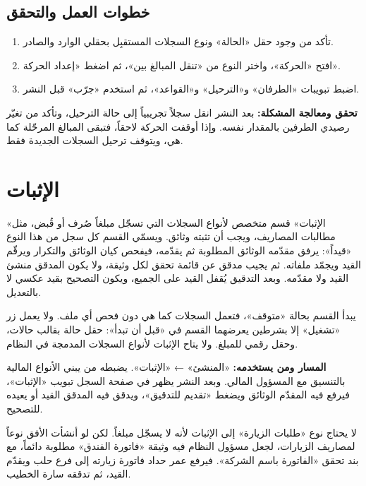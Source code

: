 \subsection{خطوات العمل والتحقق}
\begin{enumerate}
\item تأكد من وجود حقل «الحالة» ونوع السجلات المستقبِل بحقلي الوارد والصادر.
\item افتح «الحركة»، واختر النوع من «تنقل المبالغ بين»، ثم اضغط «إعداد الحركة».
\item اضبط تبويبات «الطرفان» و«الترحيل» و«القواعد»، ثم استخدم «جرّب» قبل النشر.
\end{enumerate}

\textbf{تحقق ومعالجة المشكلة:} بعد النشر انقل سجلاً تجريبياً إلى حالة الترحيل، وتأكد من تغيّر رصيدي الطرفين بالمقدار نفسه. وإذا أوقفت الحركة لاحقاً، فتبقى المبالغ المرحّلة كما هي، ويتوقف ترحيل السجلات الجديدة فقط.

\clearpage
\section{الإثبات}
\label{sec:builder-feature-evidence}

«الإثبات» قسم متخصص لأنواع السجلات التي تسجّل مبلغاً صُرف أو قُبض، مثل مطالبات المصاريف، ويجب أن تثبته وثائق. ويسمّي القسم كل سجل من هذا النوع «قيداً»: يرفق مقدّمه الوثائق المطلوبة ثم يقدّمه، فيفحص كيان الوثائق والتكرار ويرقّم القيد ويجمّد ملفاته. ثم يجيب مدقق عن قائمة تحقق لكل وثيقة، ولا يكون المدقق منشئ القيد ولا مقدّمه. وبعد التدقيق يُقفل القيد على الجميع، ويكون التصحيح بقيد عكسي لا بالتعديل.

يبدأ القسم بحالة «متوقف»، فتعمل السجلات كما هي دون فحص أي ملف. ولا يعمل زر «تشغيل» إلا بشرطين يعرضهما القسم في «قبل أن تبدأ»: حقل حالة بقالب حالات، وحقل رقمي للمبلغ. ولا يتاح الإثبات لأنواع السجلات المدمجة في النظام.

\textbf{المسار ومن يستخدمه:} «المنشئ» ← «الإثبات». يضبطه من يبني الأنواع المالية بالتنسيق مع المسؤول المالي. وبعد النشر يظهر في صفحة السجل تبويب «الإثبات»، فيرفع فيه المقدّم الوثائق ويضغط «تقديم للتدقيق»، ويدقق فيه المدقق القيد أو يعيده للتصحيح.

\begin{rcnote}
لا يحتاج نوع «طلبات الزيارة» إلى الإثبات لأنه لا يسجّل مبلغاً. لكن لو أنشأت الأفق نوعاً لمصاريف الزيارات، لجعل مسؤول النظام فيه وثيقة «فاتورة الفندق» مطلوبة دائماً، مع بند تحقق «الفاتورة باسم الشركة». فيرفع عمر حداد فاتورة زيارته إلى فرع حلب ويقدّم القيد، ثم تدققه سارة الخطيب.
\end{rcnote}

